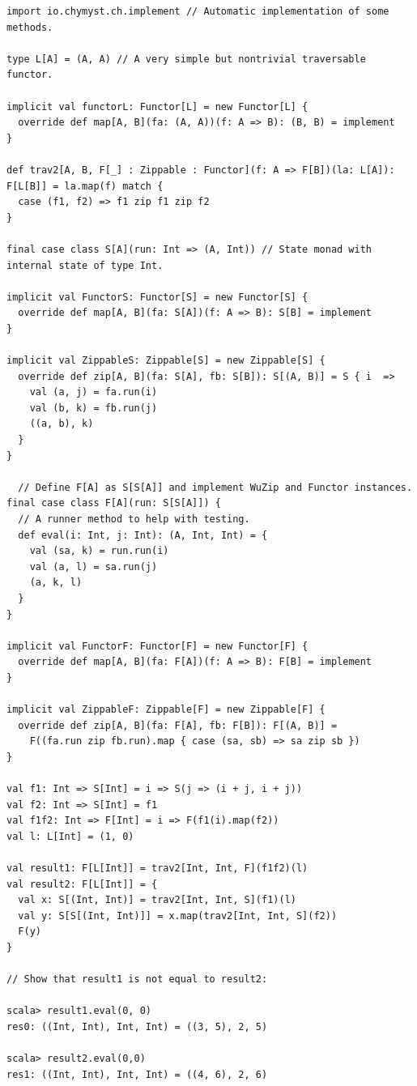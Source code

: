 \begin{lstlisting}[frame=single,fillcolor={\color{black}},framesep={0.2mm},framexleftmargin=2mm,framexrightmargin=2mm,framextopmargin=2mm,framexbottommargin=2mm]
import io.chymyst.ch.implement // Automatic implementation of some methods.

type L[A] = (A, A) // A very simple but nontrivial traversable functor.

implicit val functorL: Functor[L] = new Functor[L] {
  override def map[A, B](fa: (A, A))(f: A => B): (B, B) = implement
}

def trav2[A, B, F[_] : Zippable : Functor](f: A => F[B])(la: L[A]): F[L[B]] = la.map(f) match {
  case (f1, f2) => f1 zip f1 zip f2
}

final case class S[A](run: Int => (A, Int)) // State monad with internal state of type Int.

implicit val FunctorS: Functor[S] = new Functor[S] {
  override def map[A, B](fa: S[A])(f: A => B): S[B] = implement
}

implicit val ZippableS: Zippable[S] = new Zippable[S] {
  override def zip[A, B](fa: S[A], fb: S[B]): S[(A, B)] = S { i  =>
    val (a, j) = fa.run(i)
    val (b, k) = fb.run(j)
    ((a, b), k)
  }
}

  // Define F[A] as S[S[A]] and implement WuZip and Functor instances.
final case class F[A](run: S[S[A]]) {
  // A runner method to help with testing.
  def eval(i: Int, j: Int): (A, Int, Int) = {
    val (sa, k) = run.run(i)
    val (a, l) = sa.run(j)
    (a, k, l)
  }
}

implicit val FunctorF: Functor[F] = new Functor[F] {
  override def map[A, B](fa: F[A])(f: A => B): F[B] = implement
}

implicit val ZippableF: Zippable[F] = new Zippable[F] {
  override def zip[A, B](fa: F[A], fb: F[B]): F[(A, B)] =
    F((fa.run zip fb.run).map { case (sa, sb) => sa zip sb })
}

val f1: Int => S[Int] = i => S(j => (i + j, i + j))
val f2: Int => S[Int] = f1
val f1f2: Int => F[Int] = i => F(f1(i).map(f2))
val l: L[Int] = (1, 0)

val result1: F[L[Int]] = trav2[Int, Int, F](f1f2)(l)
val result2: F[L[Int]] = {
  val x: S[(Int, Int)] = trav2[Int, Int, S](f1)(l)
  val y: S[S[(Int, Int)]] = x.map(trav2[Int, Int, S](f2))
  F(y)
}

// Show that result1 is not equal to result2:

scala> result1.eval(0, 0)
res0: ((Int, Int), Int, Int) = ((3, 5), 2, 5)

scala> result2.eval(0,0)
res1: ((Int, Int), Int, Int) = ((4, 6), 2, 6) 
\end{lstlisting}

